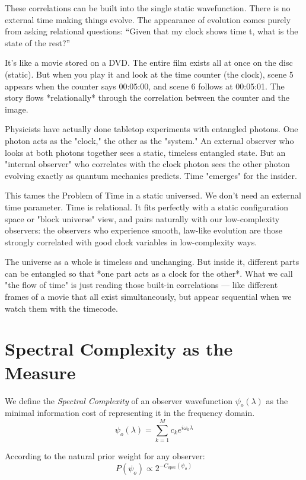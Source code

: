 These correlations can be built into the single static wavefunction.
There is no external time making things evolve.
The appearance of evolution comes purely from asking relational questions: ``Given that my clock shows time t, what is the state of the rest?''

It's like a movie stored on a DVD. The entire film exists all at once on the disc (static). But when you play it and look at the time counter (the clock), scene 5 appears when the counter says 00:05:00, and scene 6 follows at 00:05:01. The story flows *relationally* through the correlation between the counter and the image.

Physicists have actually done tabletop experiments with entangled photons. One photon acts as the "clock," the other as the "system."
An external observer who looks at both photons together sees a static, timeless entangled state.
But an "internal observer" who correlates with the clock photon sees the other photon evolving exactly as quantum mechanics predicts.
Time "emerges" for the insider.

This tames the Problem of Time in a static universed. We don't need an external time parameter. Time is relational.
It fits perfectly with a static configuration space or "block universe" view, and pairs naturally with our low-complexity observers:
the observers who experience smooth, law-like evolution are those strongly correlated with good clock variables in low-complexity ways.

The universe as a whole is timeless and unchanging. But inside it, different parts can be entangled so that *one part acts as a clock for the other*.
What we call "the flow of time" is just reading those built-in correlations — like different frames of a movie that all exist simultaneously, but appear sequential when we watch them with the timecode.


\section{Spectral Complexity as the Measure}

We define the \textit{Spectral Complexity} of an observer wavefunction $\psi_o(\lambda)$ as the minimal information cost of representing it in the frequency domain.
\begin{equation}
\psi_o(\lambda) = \sum_{k=1}^{M} c_k e^{i\omega_k\lambda}
\end{equation}

According to the natural prior weight for any observer:
\begin{equation}
P(\psi_o) \propto 2^{-C_{\text{spec}}(\psi_o)}
\end{equation}

